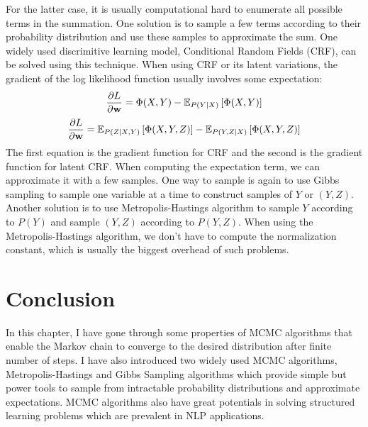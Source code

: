 For the latter case, it is usually computational hard to enumerate all possible terms in the summation. One solution is to sample a few terms according to their probability distribution and use these samples to approximate the sum. 
One widely used discrimitive learning model, Conditional Random Fields (CRF), can be solved using this technique. When using CRF or its latent variations, the 
gradient of the log likelihood function usually involves some expectation:
$$\frac{\partial{L}}{\partial{{\bf w}}}= \Phi(X, Y) - \mathbb{E}_{P(Y|X)} \left[\Phi(X,Y)\right]$$
$$\frac{\partial{L}}{\partial{{\bf w}}}= \mathbb{E}_{P(Z|X, Y)}\left[\Phi(X, Y, Z)\right] - \mathbb{E}_{P(Y, Z|X)} \left[\Phi(X,Y,Z)\right]$$
The first equation is the gradient function for CRF and the second is the gradient function for latent CRF. When computing the expectation term, we can approximate it with a few samples. One way to
sample is again to use Gibbs sampling to sample one variable at a time to construct samples of $Y$ or $(Y, Z)$. Another solution is to
use Metropolis-Hastings algorithm to sample $Y$ according to $P(Y)$ and sample $(Y, Z)$ according to $P(Y, Z)$. When using the Metropolis-Hastings algorithm, we don't have to compute the normalization constant, which is usually the biggest overhead of such problems.
\section{Conclusion}
In this chapter, I have gone through some properties of MCMC algorithms that enable the Markov chain to converge to the desired distribution after
finite number of steps. I have also introduced two widely used MCMC algorithms, Metropolis-Hastings and Gibbs Sampling algorithms which provide simple but power tools to sample from intractable probability distributions and approximate expectations.
MCMC algorithms also have great potentials in solving structured learning problems which are prevalent in NLP applications.
